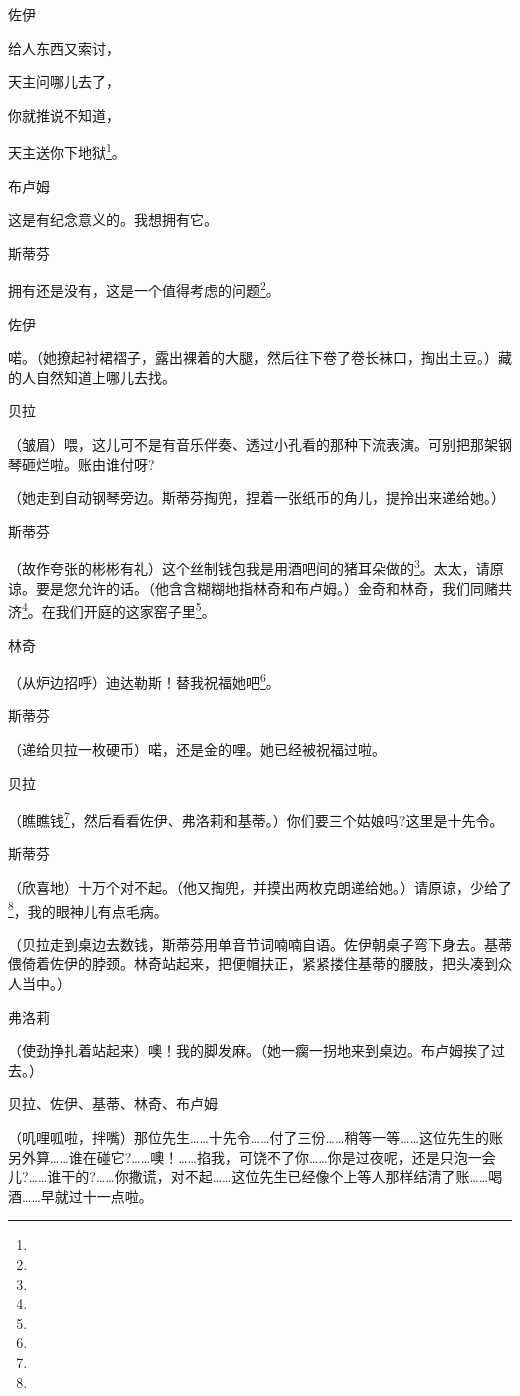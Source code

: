 \par 佐伊
\par 给人东西又索讨，
\par 天主问哪儿去了，
\par 你就推说不知道，
\par 天主送你下地狱\footnote{}。
\par 布卢姆
\par 这是有纪念意义的。我想拥有它。
\par 斯蒂芬
\par 拥有还是没有，这是一个值得考虑的问题\footnote{}。
\par 佐伊
\par 喏。（她撩起衬裙褶子，露出裸着的大腿，然后往下卷了卷长袜口，掏出土豆。）藏的人自然知道上哪儿去找。
\par 贝拉
\par （皱眉）喂，这儿可不是有音乐伴奏、透过小孔看的那种下流表演。可别把那架钢琴砸烂啦。账由谁付呀?
\par （她走到自动钢琴旁边。斯蒂芬掏兜，捏着一张纸币的角儿，提拎出来递给她。）
\par 斯蒂芬
\par （故作夸张的彬彬有礼）这个丝制钱包我是用酒吧间的猪耳朵做的\footnote{}。太太，请原谅。要是您允许的话。（他含含糊糊地指林奇和布卢姆。）金奇和林奇，我们同赌共济\footnote{}。在我们开庭的这家窑子里\footnote{}。
\par 林奇
\par （从炉边招呼）迪达勒斯！替我祝福她吧\footnote{}。
\par 斯蒂芬
\par （递给贝拉一枚硬币）喏，还是金的哩。她已经被祝福过啦。
\par 贝拉
\par （瞧瞧钱\footnote{}，然后看看佐伊、弗洛莉和基蒂。）你们要三个姑娘吗?这里是十先令。
\par 斯蒂芬
\par （欣喜地）十万个对不起。（他又掏兜，并摸出两枚克朗递给她。）请原谅，少给了\footnote{}，我的眼神儿有点毛病。
\par （贝拉走到桌边去数钱，斯蒂芬用单音节词喃喃自语。佐伊朝桌子弯下身去。基蒂偎倚着佐伊的脖颈。林奇站起来，把便帽扶正，紧紧搂住基蒂的腰肢，把头凑到众人当中。）
\par 弗洛莉
\par （使劲挣扎着站起来）噢！我的脚发麻。（她一瘸一拐地来到桌边。布卢姆挨了过去。）
\par 贝拉、佐伊、基蒂、林奇、布卢姆
\par （叽哩呱啦，拌嘴）那位先生……十先令……付了三份……稍等一等……这位先生的账另外算……谁在碰它?……噢！……掐我，可饶不了你……你是过夜呢，还是只泡一会儿?……谁干的?……你撒谎，对不起……这位先生已经像个上等人那样结清了账……喝酒……早就过十一点啦。
